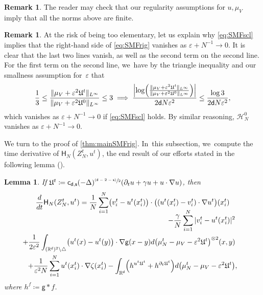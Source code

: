 \documentclass[JEP,XML,SOM,Unicode,published]{cedram}
\newcommand{\psfrac}[2]{\sfrac{(#1)}{#2}}
\theoremstyle{plain}
\newtheorem{lemma}[thm]{Lemma}
\theoremstyle{definition}
\newtheorem{remark}[thm]{Remark}
\DeclarePairedDelimiter{\pa}{\lparen}{\rparen}
\let\div\relax
\DeclareMathOperator{\div}{\mathrm{div}}
\newcommand{\R}{{\mathbb{R}}}
\let\ga\gamma
\let\D\Delta
\let\vep\varepsilon
\let\p\partial
\let\uz Z
\newcommand{\Uu}{\mathfrak{U}}
\newcommand{\Hr}{\mathsf{H}}
\renewcommand{\d}{\mathsf{d}}
\newcommand{\g}{{\mathsf{g}}}
\newcommand{\s}{\mathsf{s}}
\newcommand{\cd}{\mathsf{c}_{\mathsf{d},\mathsf{s}}}
\begin{document}
\begin{remark}
The reader may check that our regularity assumptions for $u,\mu_V$ imply that all the norms above are finite.
\end{remark}

\begin{remark}
At the risk of being too elementary, let us explain why \eqref{eq:SMFscl} implies that the right-hand side of \eqref{eq:SMFrig} vanishes as $\vep+N^{-1}\to 0$. It is clear that the last two lines vanish, as well as the second term on the second line. For the first term on the second line, we~have by the triangle inequality and our smallness assumption for~$\vep$ that
\begin{equation*}
\frac{1}{3}\leq \frac{\|\mu_V+\vep^2\Uu^t\|_{L^\infty}}{\|\mu_V+\vep^2\Uu^0\|_{L^\infty}} \leq 3 \implies \frac{\left|\log\pa*{\frac{\|\mu_V+\vep^2\Uu^t\|_{L^\infty}}{\|\mu_V+\vep^2\Uu^0\|_{L^\infty}}}\right|}{2\d N\vep^2} \leq \frac{\log 3}{2\d N\vep^2},
\end{equation*}
which vanishes as $\vep+N^{-1}\to 0$ if \eqref{eq:SMFscl} holds. By similar reasoning, $\mathscr{H}_{N}^0$ vanishes as $\vep+N^{-1}\to 0$.
\end{remark}

\label{ssec:MPcomp}
We turn to the proof of \cref{thm:mainSMFrig}. In~this subsection, we~compute the time derivative of $\Hr_{N}(\uz_N^t,u^t)$, the end result of our efforts stated in the following lemma (\cf \cite[Eq.\,(2.7)]{HkI2021}).

\begin{lemma}\label{lem:MEsmfID}
If $\Uu^t \coloneqq \cd(-\D)^{\psfrac{\d-2-\s}{2}}\div(\p_t u + \gamma u + u\cdot\nabla u)$, then
\begin{multline}\label{eq:dtHNid}
\frac{d}{dt}\Hr_{N}(\uz_N^t,u^t) = \frac{1}{N}\sum_{i=1}^N \pa*{v_i^t - u^t(x_i^t)}\cdot \pa*{(u^t(x_i^t)- v_i^t)\cdot\nabla u^t}(x_i^t)\\[-10pt]
\shoveright{-\frac{\ga}{N}\sum_{i=1}^N |v_i^t-u^t(x_i^t)|^2}\\
\shoveright{+\frac{1}{2\vep^2}\int_{(\R^\d)^2\setminus\triangle} \pa*{u^t(x)-u^t(y)}\cdot\nabla\g(x-y)d\pa*{\mu_N^t-\mu_V-\vep^2\Uu^t}^{\otimes 2}(x,y)} \\
+\frac{1}{\vep^2N}\sum_{i=1}^N u^t(x_i^t)\cdot \nabla\zeta(x_i^t)-\int_{\R^\d}\pa*{\div h^{u^t\Uu^t}+h^{\p_t\Uu^t}}d\pa*{\mu_N^t-\mu_V-\vep^2\Uu^t},
\end{multline}
where $h^f\coloneqq \g\ast f$.
\end{lemma}
\end{document}
